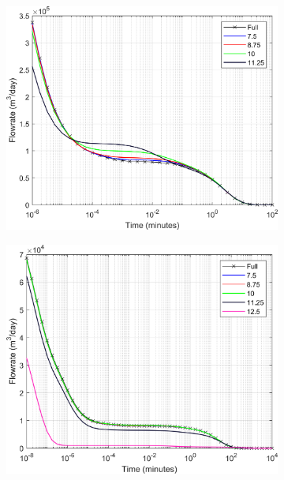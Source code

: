 \documentclass[Supplementary.tex]{subfiles}
\begin{document}
 \begin{figure}[ht]
     \centering
     \begin{subfigure}{0.3\textwidth}
        \includegraphics[width=\textwidth]{3D_DD/Plot_Drawdown_Case_01_nohead.png}
        \label{fig:3D_DD_1}
     \end{subfigure}
     \begin{subfigure}{0.3\textwidth}
        \includegraphics[width=\textwidth]{3D_DD/Plot_Drawdown_Case_02_nohead.png}
        \label{fig:3D_DD_2}

\end{subfigure}
\end{figure}
\end{document}
